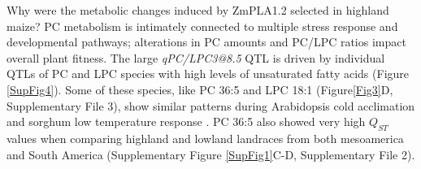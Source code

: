 \documentclass[9pt,twocolumn,twoside,lineno]{BioRxiv}
\begin{document}
Why were the metabolic changes induced by ZmPLA1.2 selected in highland maize?
PC metabolism is intimately connected to multiple stress response and developmental pathways; alterations in PC amounts and PC/LPC ratios impact overall plant fitness.
The large \textit{qPC/LPC3@8.5} QTL is driven by individual QTLs of PC and LPC species with high levels of unsaturated fatty acids (Figure \ref{SupFig4}).
Some of these species, like PC 36:5 and LPC 18:1  (Figure\ref{Fig3}D, Supplementary File 3), show similar patterns during Arabidopsis cold acclimation \cite{Welti2002-uk} and sorghum low temperature response \cite{Marla2017-ph}.
PC 36:5 also showed very high $Q_{ST}$ values when comparing highland and lowland landraces from both mesoamerica and South America (Supplementary Figure \ref{SupFig1}C-D, Supplementary File 2).
\end{document}
